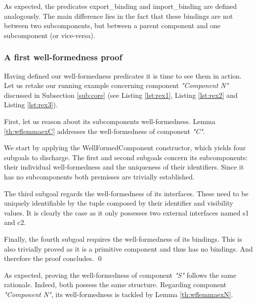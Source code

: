 		As expected, the predicates \textsf{export\_binding} and \textsf{import\_binding} are defined
	analogously. The main difference lies in the fact that these \textsf{binding}s are not between two sub\textsf{component}s,
	but between a parent \textsf{componen}t and one sub\textsf{component} (or vice-versa). 
	

\subsubsection{A first well-formedness proof}
	
	Having defined	 our well-formedness predicates it is time to see them in action. Let us retake our
	running example concerning \textsf{component} \textit{"Component N"} discussed in
	Subsection \ref{sub:core} (see Listing \ref{lst:rex1}, Listing \ref{lst:rex2} and Listing \ref{lst:rex3}). 
	
		First, let us reason about its sub\textsf{component}s well-formedness. Lemma \ref{th:wflemmaexC}
	addresses the well-formedness of \textsf{component} \textit{"C"}.
				
			
	\begin{lemma} \label{th:wflemmaexC} 
					
	
		We start by applying the \textsf{WellFormedComponent} constructor, which yields
		four subgoals to discharge.			
		  The first and second subgoals concern its subcomponents: their 
		individual well-formedness and the uniqueness of their identifiers.		
		Since it has no	subcomponents both premisses are trivially established. 
			
			The third subgoal regards the well-formedness of its interfaces. These need
			to be uniquely identifiable by the tuple composed by their identifier and
			visibility values. It is clearly the case as it only possesses two external interfaces
			named \textsf{s1} and \textsf{c2}.			
			
			Finally, the fourth subgoal requires the well-formedness of its bindings. This is also
			trivially proved as it is a primitive component and thus has no bindings.
			And therefore the proof concludes. \qed
	\end{lemma}				

			
	\noindent As expected, proving the well-formedness of \textsf{component} \textit{"S"} follows
	the same rationale. Indeed, both	possess the same structure. Regarding 
	\textsf{component} \textit{"Component N"}, its well-formedness is tackled by Lemma \ref{th:wflemmaexN}. 
				
